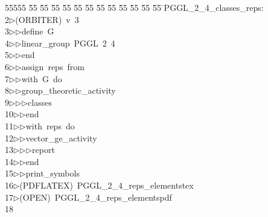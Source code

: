 %
%
\begin{tabbing}
55555 \= 55 \= 55 \= 55 \= 55 \= 55 \= 55 \= 55 \= 55 \= 55 \= 55 \= 55 \= 55 \= \>PGGL\_2\_4\_classes\_reps:\\[0pt]
2\>$\triangleright$\>(ORBITER)\ v\ 3\ \\[0pt]
3\>$\triangleright$\>$\triangleright$\>define\ G\ \\[0pt]
4\>$\triangleright$\>$\triangleright$\>linear\_group\ PGGL\ 2\ 4\ \\[0pt]
5\>$\triangleright$\>$\triangleright$\>end\ \\[0pt]
6\>$\triangleright$\>$\triangleright$\>assign\ reps\ from\ \\[0pt]
7\>$\triangleright$\>$\triangleright$\>with\ G\ do\ \\[0pt]
8\>$\triangleright$\>$\triangleright$\>group\_theoretic\_activity\ \\[0pt]
9\>$\triangleright$\>$\triangleright$\>$\triangleright$\>classes\ \\[0pt]
10\>$\triangleright$\>$\triangleright$\>end\ \\[0pt]
11\>$\triangleright$\>$\triangleright$\>with\ reps\ do\ \\[0pt]
12\>$\triangleright$\>$\triangleright$\>vector\_ge\_activity\ \\[0pt]
13\>$\triangleright$\>$\triangleright$\>$\triangleright$\>report\ \\[0pt]
14\>$\triangleright$\>$\triangleright$\>end\ \\[0pt]
15\>$\triangleright$\>$\triangleright$\>print\_symbols\\[0pt]
16\>$\triangleright$\>(PDFLATEX)\ PGGL\_2\_4\_reps\_elementstex\\[0pt]
17\>$\triangleright$\>(OPEN)\ PGGL\_2\_4\_reps\_elementspdf\\[0pt]
18\>\end{tabbing}
